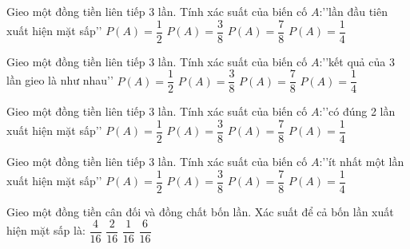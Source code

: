 \begin{ex}
Gieo một đồng tiền liên tiếp 3 lần. Tính xác suất của biến cố $A$:\rq\rq lần đầu tiên xuất hiện mặt sấp\rq\rq 
\choice
{\True $P(A)=\dfrac{1}{2}$}
{$P(A)=\dfrac{3}{8}$}
{$P(A)=\dfrac{7}{8}$}
{$P(A)=\dfrac{1}{4}$}
\end{ex}
\begin{ex}
Gieo một đồng tiền liên tiếp 3 lần. Tính xác suất của biến cố $A$:\rq\rq kết quả của 3 lần gieo là như nhau\rq\rq 
\choice
{$P(A)=\dfrac{1}{2}$}
{$P(A)=\dfrac{3}{8}$}
{$P(A)=\dfrac{7}{8}$}
{\True $P(A)=\dfrac{1}{4}$}
\end{ex}
\begin{ex}
Gieo một đồng tiền liên tiếp 3 lần. Tính xác suất của biến cố $A$:\rq\rq có đúng 2 lần xuất hiện mặt sấp\rq\rq 
\choice
{$P(A)=\dfrac{1}{2}$}
{\True $P(A)=\dfrac{3}{8}$}
{$P(A)=\dfrac{7}{8}$}
{$P(A)=\dfrac{1}{4}$}
\end{ex}
\begin{ex}
Gieo một đồng tiền liên tiếp 3 lần. Tính xác suất của biến cố $A$:\rq\rq ít nhất một lần xuất hiện mặt sấp\rq\rq 
\choice
{$P(A)=\dfrac{1}{2}$}
{$P(A)=\dfrac{3}{8}$}
{\True $P(A)=\dfrac{7}{8}$}
{$P(A)=\dfrac{1}{4}$}
\end{ex}
\begin{ex}
Gieo một đồng tiền cân đối và đồng chất bốn lần. Xác suất để cả bốn lần xuất hiện mặt sấp là:
\choice
{$\dfrac{4}{16}$}
{$\dfrac{2}{16}$}
{\True $\dfrac{1}{16}$}
{$\dfrac{6}{16}$}
\end{ex}
